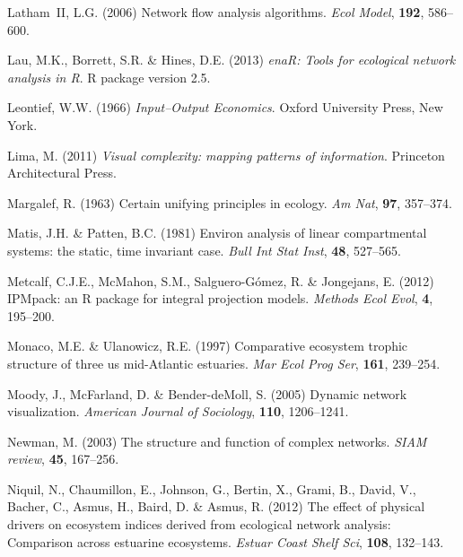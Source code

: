 \documentclass[11pt]{article}
\begin{document}
\begin{thebibliography}{79}
Latham~II, L.G. (2006) Network flow analysis algorithms.
\newblock \emph{Ecol Model}, \textbf{192}, 586--600.

Lau, M.K., Borrett, S.R. \& Hines, D.E. (2013) \emph{enaR: Tools for ecological
  network analysis in R}.
\newblock R package version 2.5.

Leontief, W.W. (1966) \emph{Input--Output Economics}.
\newblock Oxford University Press, New York.

Lima, M. (2011) \emph{Visual complexity: mapping patterns of information}.
\newblock Princeton Architectural Press.

Margalef, R. (1963) Certain unifying principles in ecology.
\newblock \emph{Am Nat}, \textbf{97}, 357--374.

Matis, J.H. \& Patten, B.C. (1981) Environ analysis of linear compartmental
  systems: the static, time invariant case.
\newblock \emph{Bull Int Stat Inst}, \textbf{48}, 527--565.

Metcalf, C.J.E., McMahon, S.M., Salguero-G{\'o}mez, R. \& Jongejans, E. (2012)
  {IPM}pack: an {R} package for integral projection models.
\newblock \emph{Methods Ecol Evol}, \textbf{4}, 195--200.

Monaco, M.E. \& Ulanowicz, R.E. (1997) Comparative ecosystem trophic structure
  of three us mid-{A}tlantic estuaries.
\newblock \emph{Mar Ecol Prog Ser}, \textbf{161}, 239--254.

Moody, J., McFarland, D. \& Bender-deMoll, S. (2005) Dynamic network
  visualization.
\newblock \emph{American Journal of Sociology}, \textbf{110}, 1206--1241.

Newman, M. (2003) The structure and function of complex networks.
\newblock \emph{SIAM review}, \textbf{45}, 167--256.

Niquil, N., Chaumillon, E., Johnson, G., Bertin, X., Grami, B., David, V.,
  Bacher, C., Asmus, H., Baird, D. \& Asmus, R. (2012) The effect of physical
  drivers on ecosystem indices derived from ecological network analysis:
  Comparison across estuarine ecosystems.
\newblock \emph{Estuar Coast Shelf Sci}, \textbf{108}, 132--143.


\end{thebibliography}
\end{document}

